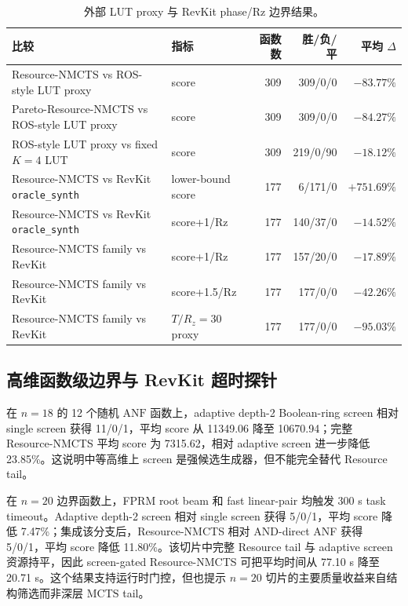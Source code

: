\documentclass[UTF8,fontset=macnew,11pt]{ctexart}
\newcommand{\method}{Resource-NMCTS}
\newcommand{\screen}{Boolean-ring screen}
\newcommand{\anf}{\ensuremath{\mathrm{ANF}}}
\newcommand{\mcts}{\ensuremath{\mathrm{MCTS}}}
\begin{document}
\begin{table}[H]
\centering
\scriptsize
\caption{外部 LUT proxy 与 RevKit phase/Rz 边界结果。}
\label{tab:external-v27}
\begin{tabularx}{\linewidth}{>{\raggedright\arraybackslash}Xlrrr}
\toprule
比较 & 指标 & 函数数 & 胜/负/平 & 平均 $\Delta$ \\
\midrule
\method{} vs ROS-style LUT proxy & score & 309 & 309/0/0 & $-83.77\%$ \\
Pareto-\method{} vs ROS-style LUT proxy & score & 309 & 309/0/0 & $-84.27\%$ \\
ROS-style LUT proxy vs fixed $K=4$ LUT & score & 309 & 219/0/90 & $-18.12\%$ \\
\method{} vs RevKit \texttt{oracle\_synth} & lower-bound score & 177 & 6/171/0 & $+751.69\%$ \\
\method{} vs RevKit \texttt{oracle\_synth} & score+1/Rz & 177 & 140/37/0 & $-14.52\%$ \\
Resource-NMCTS family vs RevKit & score+1/Rz & 177 & 157/20/0 & $-17.89\%$ \\
Resource-NMCTS family vs RevKit & score+1.5/Rz & 177 & 177/0/0 & $-42.26\%$ \\
Resource-NMCTS family vs RevKit & $T/R_z=30$ proxy & 177 & 177/0/0 & $-95.03\%$ \\
\bottomrule
\end{tabularx}
\end{table}

\subsection{高维函数级边界与 RevKit 超时探针}

在 $n=18$ 的 12 个随机 \anf{} 函数上，adaptive depth-2 \screen{} 相对 single screen 获得 11/0/1，平均 score 从 11349.06 降至 10670.94；完整 \method{} 平均 score 为 7315.62，相对 adaptive screen 进一步降低 23.85\%。这说明中等高维上 screen 是强候选生成器，但不能完全替代 Resource tail。

在 $n=20$ 边界函数上，FPRM root beam 和 fast linear-pair 均触发 300 s task timeout。Adaptive depth-2 screen 相对 single screen 获得 5/0/1，平均 score 降低 7.47\%；集成该分支后，\method{} 相对 AND-direct ANF 获得 5/0/1，平均 score 降低 11.80\%。该切片中完整 Resource tail 与 adaptive screen 资源持平，因此 screen-gated \method{} 可把平均时间从 77.10 s 降至 20.71 s。这个结果支持运行时门控，但也提示 $n=20$ 切片的主要质量收益来自结构筛选而非深层 \mcts{} tail。
\end{document}

